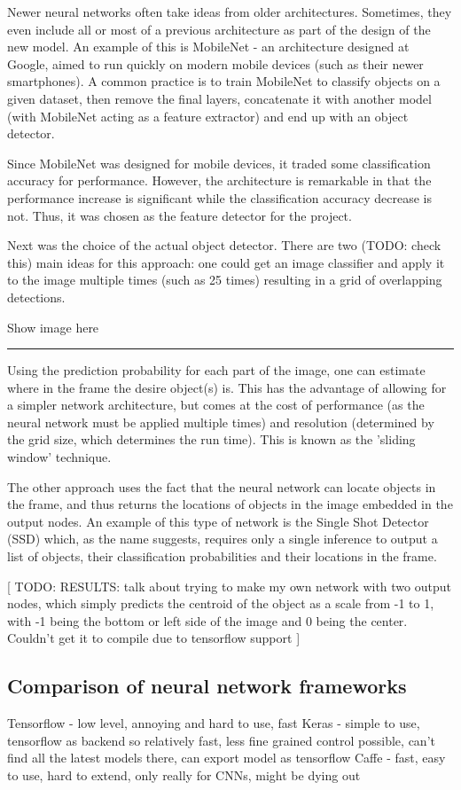 Newer neural networks often take ideas from older architectures. Sometimes, they even include all or most of a previous architecture as part of the design of the new model. An example of this is MobileNet - an architecture designed at Google, aimed to run quickly on modern mobile devices (such as their newer smartphones). A common practice is to train MobileNet to classify objects on a given dataset, then remove the final layers, concatenate it with another model (with MobileNet acting as a feature extractor) and end up with an object detector.

Since MobileNet was designed for mobile devices, it traded some classification accuracy for performance. However, the architecture is remarkable in that the performance increase is significant while the classification accuracy decrease is not. Thus, it was chosen as the feature detector for the project.

Next was the choice of the actual object detector. There are two (TODO: check this) main ideas for this approach: one could get an image classifier and apply it to the image multiple times (such as 25 times) resulting in a grid of overlapping detections.

{\Large Show image here}
\hrule

Using the prediction probability for each part of the image, one can estimate where in the frame the desire object(s) is. This has the advantage of allowing for a simpler network architecture, but comes at the cost of performance (as the neural network must be applied multiple times) and resolution (determined by the grid size, which determines the run time). This is known as the 'sliding window' technique.

The other approach uses the fact that the neural network can locate objects in the frame, and thus returns the locations of objects in the image embedded in the output nodes. An example of this type of network is the Single Shot Detector (SSD) which, as the name suggests, requires only a single inference to output a list of objects, their classification probabilities and their locations in the frame.

[ TODO: RESULTS: talk about trying to make my own network with two output nodes, which simply predicts the centroid of the object as a scale from -1 to 1, with -1 being the bottom or left side of the image and 0 being the center. Couldn't get it to compile due to tensorflow support ]

\subsection{Comparison of neural network frameworks}
Tensorflow - low level, annoying and hard to use, fast
Keras - simple to use, tensorflow as backend so relatively fast, less fine grained control possible, can't find all the latest models there, can export model as tensorflow
Caffe - fast, easy to use, hard to extend, only really for CNNs, might be dying out
